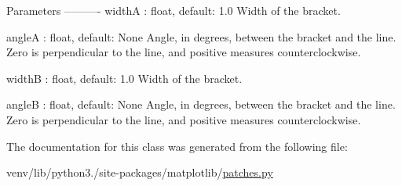 \begin{DoxyVerb}Parameters
----------
widthA : float, default: 1.0
    Width of the bracket.

angleA : float, default: None
    Angle, in degrees, between the bracket and the line. Zero is
    perpendicular to the line, and positive measures
    counterclockwise.

widthB : float, default: 1.0
    Width of the bracket.

angleB : float, default: None
    Angle, in degrees, between the bracket and the line. Zero is
    perpendicular to the line, and positive measures
    counterclockwise.
\end{DoxyVerb}
 

The documentation for this class was generated from the following file\+:\begin{DoxyCompactItemize}
\item 
venv/lib/python3./site-\/packages/matplotlib/\hyperlink{patches_8py}{patches.\+py}\end{DoxyCompactItemize}
